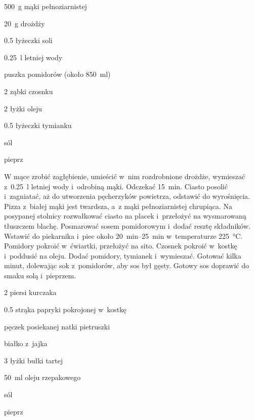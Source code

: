 \documentclass[../kucharek.tex]{subfiles}
\begin{document}

\begin{Ingred}[ciasto]
    \item \qty{500}{\gram} mąki pełnoziarnistej
    \item \qty{20}{\gram} drożdży
    \item \num{.5} łyżeczki soli
    \item \qty{.25}{\litre} letniej wody
\end{Ingred}

\begin{Ingred}
    \item puszka pomidorów (około \qty{850}{\milli\litre})
    \item \num{2} ząbki czosnku
    \item \num{2} łyżki oleju
    \item \num{.5} łyżeczki tymianku
    \item sól
    \item pieprz
\end{Ingred}

 W mące zrobić zagłębienie, umieścić w~nim rozdrobnione drożdże,
wymieszać z~\qty{.25}{\litre} letniej wody i~odrobiną mąki. Odczekać
\qty{15}{\minute}. Ciasto posolić i~zagniatać, aż do utworzenia pęcherzyków
powietrza, odstawić do wyrośnięcia. Pizza z~białej mąki jest twardsza, a~z mąki
pełnoziarnistej chrupiąca. Na posypanej stolnicy rozwałkować ciasto na placek
i~przełożyć na wysmarowaną tłuszczem blachę. Posmarować sosem pomidorowym
i~dodać resztę składników. Wstawić do piekarnika i~piec około
\qtyrange{20}{25}{\minute} w~temperaturze \qty{225}{\celsius}.
 Pomidory pokroić w~ćwiartki, przełożyć na sito. Czosnek
pokroić w~kostkę i~poddusić na oleju. Dodać pomidory, tymianek i~wymieszać.
Gotować kilka minut, dolewając sok z~pomidorów, aby sos był gęsty. Gotowy sos
doprawić do smaku solą i~pieprzem.


\begin{Ingred}
    \item \num{2} piersi kurczaka
    \item \num{.5} strąka papryki pokrojonej w~kostkę
    \item pęczek posiekanej natki pietruszki
    \item białko z~jajka
    \item \num{3} łyżki bułki tartej
    \item \qty{50}{\milli\litre} oleju rzepakowego
    \item sól
    \item pieprz
\end{Ingred}
\end{document}
